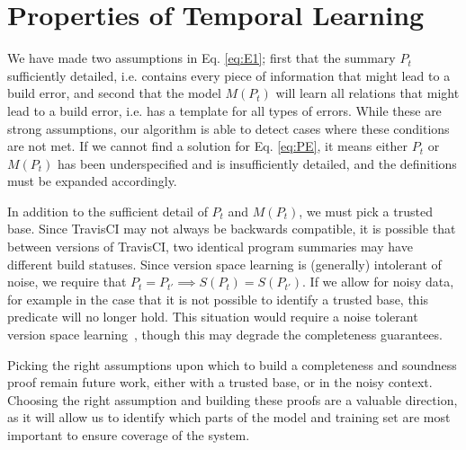 \section{Properties of Temporal Learning}

We have made two assumptions in Eq. \ref{eq:E1}; first that the summary $P_t$ sufficiently detailed, i.e. contains every piece of information that might lead to a build error, and second that the model $M(P_t)$ will learn all relations that might lead to a build error, i.e. has a template for all types of errors.
While these are strong assumptions, our algorithm is able to detect cases where these conditions are not met.
If we cannot find a solution for Eq. \ref{eq:PE}, it means either $P_t$ or $M(P_t)$ has been underspecified and is insufficiently detailed, and the definitions must be expanded accordingly.

In addition to the sufficient detail of $P_t$ and $M(P_t)$, we must pick a trusted base.
Since TravisCI may not always be backwards compatible, it is possible that between versions of TravisCI, two identical program summaries may have different build statuses.
Since version space learning is (generally) intolerant of noise, we require that
$P_t = P_{t'} \implies S(P_t) = S(P_{t'})$.
If we allow for noisy data, for example in the case that it is not possible to identify a trusted base, this predicate will no longer hold.
This situation would require a noise tolerant version space learning~\cite{hong1997generalized}, though this may degrade the completeness guarantees.

Picking the right assumptions upon which to build a completeness and soundness proof remain future work, either with a trusted base, or in the noisy context.
Choosing the right assumption and building these proofs are a valuable direction, as it will allow us to identify which parts of the model and training set are most important to ensure coverage of the system.

